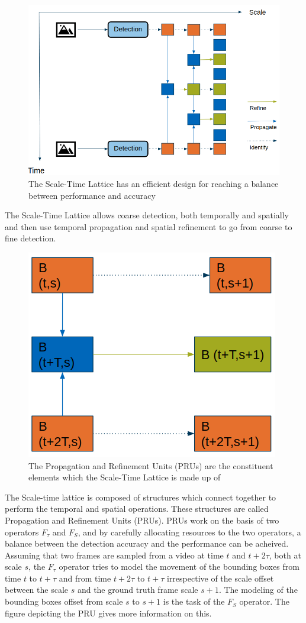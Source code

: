 \documentclass[conference]{IEEEtran}
\begin{document}
\begin{figure}[h]
\centering
\includegraphics[width=\columnwidth]{scale-time-lattice}
\caption{The Scale-Time Lattice has an efficient design for reaching a balance between performance and accuracy}
\end{figure}

The Scale-Time Lattice allows coarse detection, both temporally and spatially and then use temporal propagation and spatial refinement to go from coarse to fine detection. \newline

\begin{figure}[h]
\centering
\includegraphics[width=0.5\columnwidth]{pru}
\caption{The Propagation and Refinement Units (PRUs) are the constituent elements which the Scale-Time Lattice is made up of}
\end{figure}

The Scale-time lattice is composed of structures which connect together to perform the temporal and spatial operations. These structures are called Propagation and Refinement Units (PRUs). PRUs work on the basis of two operators $F_\tau$ and $F_S$, and by carefully allocating resources to the two operators, a balance between the detection accuracy and the performance can be acheived. Assuming that two frames are sampled from a video at time $t$ and $t+2\tau$, both at scale $s$, the $F_\tau$ operator tries to model the movement of the bounding boxes from time $t$ to $t+\tau$ and from time $t+2\tau$ to $t+\tau$ irrespective of the scale offset between the scale $s$ and the ground truth frame scale $s+1$. The modeling of the bounding boxes offset from scale $s$ to $s+1$ is the task of the $F_S$ operator. The figure depicting the PRU gives more information on this. \newline
\end{document}
